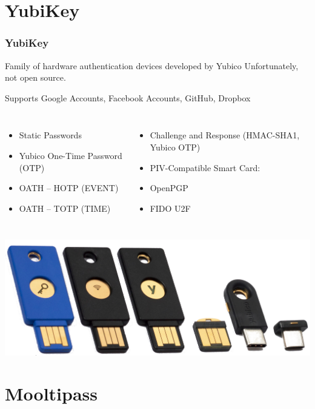\documentclass[14pt,usenames,dvipsnames]{beamer}
\begin{document}
\section*{YubiKey}

\begin{frame}
	\frametitle{YubiKey}
	
  {\fontsize{11pt}{14}\selectfont
	Family of hardware authentication devices developed by Yubico 
	Unfortunately, not open source.
	
	Supports Google Accounts, Facebook Accounts, GitHub, Dropbox
  }
  
  \begin{columns}
		\begin{itemize}
		\setlength\itemsep{-3pt}
	  \fontsize{11pt}{14}\selectfont	
			\item Static Passwords
			\item Yubico One-Time Password (OTP)
			\item OATH – HOTP (EVENT)
			\item OATH – TOTP (TIME)
	  \end{itemize} 
	  
  \begin{itemize}
	  \setlength\itemsep{-3pt}
	  \fontsize{11pt}{14}\selectfont	
			\item Challenge and Response (HMAC-SHA1, Yubico OTP)
			\item PIV-Compatible Smart Card: 	
			\item OpenPGP
			\item FIDO U2F
	  \end{itemize} 
	  
	\end{columns}
  \centering	
	  \includegraphics[width=0.8\columnwidth]{yubikeyfam.jpg}

	
\end{frame}

\section*{Mooltipass}
\end{document}
